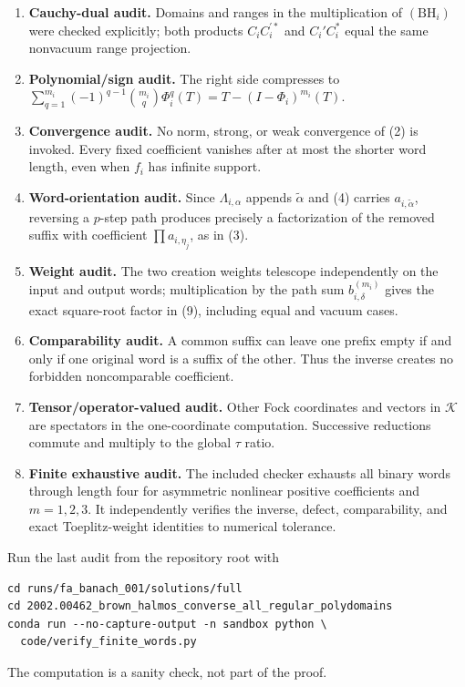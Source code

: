 \documentclass[11pt]{article}
\newcommand{\cK}{\mathcal K}
\begin{document}
\begin{enumerate}
\item \textbf{Cauchy-dual audit.}  Domains and ranges in the multiplication of $(\mathrm{BH}_i)$ were checked explicitly; both products $C_iC_i^{\prime *}$ and $C_i'C_i^*$ equal the same nonvacuum range projection.
\item \textbf{Polynomial/sign audit.}  The right side compresses to $\sum_{q=1}^{m_i}(-1)^{q-1}\binom{m_i}{q}\Phi_i^q(T)=T-(I-\Phi_i)^{m_i}(T)$.
\item \textbf{Convergence audit.}  No norm, strong, or weak convergence of (2) is invoked.  Every fixed coefficient vanishes after at most the shorter word length, even when $f_i$ has infinite support.
\item \textbf{Word-orientation audit.}  Since $\Lambda_{i,\alpha}$ appends $\widetilde\alpha$ and (4) carries $a_{i,\widetilde\alpha}$, reversing a $p$-step path produces precisely a factorization of the removed suffix with coefficient $\prod a_{i,\eta_j}$, as in (3).
\item \textbf{Weight audit.}  The two creation weights telescope independently on the input and output words; multiplication by the path sum $b_{i,\delta}^{(m_i)}$ gives the exact square-root factor in (9), including equal and vacuum cases.
\item \textbf{Comparability audit.}  A common suffix can leave one prefix empty if and only if one original word is a suffix of the other.  Thus the inverse creates no forbidden noncomparable coefficient.
\item \textbf{Tensor/operator-valued audit.}  Other Fock coordinates and vectors in $\cK$ are spectators in the one-coordinate computation.  Successive reductions commute and multiply to the global $\tau$ ratio.
\item \textbf{Finite exhaustive audit.}  The included checker exhausts all binary words through length four for asymmetric nonlinear positive coefficients and $m=1,2,3$.  It independently verifies the inverse, defect, comparability, and exact Toeplitz-weight identities to numerical tolerance.
\end{enumerate}

Run the last audit from the repository root with
\begin{verbatim}
cd runs/fa_banach_001/solutions/full
cd 2002.00462_brown_halmos_converse_all_regular_polydomains
conda run --no-capture-output -n sandbox python \
  code/verify_finite_words.py
\end{verbatim}
The computation is a sanity check, not part of the proof.
\end{document}
